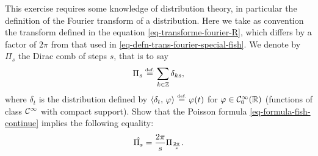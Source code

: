  
\begin{exo}
\label{exo-formula-fish-distrib}
  \label{notation-41} This exercise requires some knowledge of distribution theory, in particular the definition of the Fourier transform of a distribution. Here we take as convention the transform defined in the equation \eqref{eq-transforme-fourier-R}, which differs by a factor of $ 2 \pi $ from that used in \eqref{eq-defn-trans-fourier-special-fish}. We denote by $ \Pi_s $ the Dirac comb of steps $ s $, that is to say
\begin{equation}
\label{eq-trans-fourier-comb-dirac}
\Pi_s \stackrel{\mbox{\upshape\tiny def.}}{=} \sum_{k \in \mathbb{Z}}{\delta_{ks}},
\end{equation}
 where $ \delta_t $ is the distribution defined by $ \langle \delta_t,\,\varphi\rangle \stackrel{\mbox{\upshape\tiny def.}}{=} \varphi (t) $ for $ \varphi \in \mathcal{C}^\infty_0 (\mathbb{R} ) $ (functions of class $ \mathcal{C}^\infty $ with compact support). Show that the Poisson formula \eqref{eq-formula-fish-continue} implies the following equality:
\begin{equation*}
\hat{\Pi_s} = \frac{2 \pi}{s} \Pi_{\frac{2 \pi}{s}}.
\end{equation*}
\end{exo}
 
